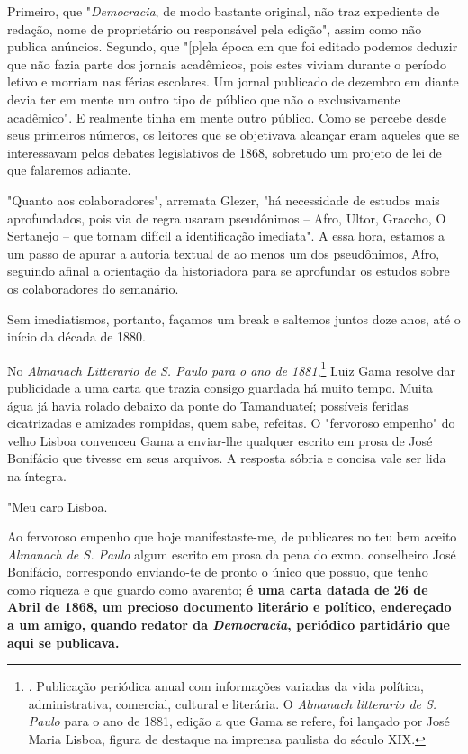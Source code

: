 Primeiro, que "\emph{Democracia}, de modo bastante original, não traz
expediente de redação, nome de proprietário ou responsável pela edição",
assim como não publica anúncios. Segundo, que "{[}p{]}ela época em que
foi editado podemos deduzir que não fazia parte dos jornais acadêmicos,
pois estes viviam durante o período letivo e morriam nas férias
escolares. Um jornal publicado de dezembro em diante devia ter em mente
um outro tipo de público que não o exclusivamente acadêmico". E
realmente tinha em mente outro público. Como se percebe desde seus
primeiros números, os leitores que se objetivava alcançar eram aqueles
que se interessavam pelos debates legislativos de 1868, sobretudo um
projeto de lei de que falaremos adiante.

"Quanto aos colaboradores", arremata Glezer, "há necessidade de estudos
mais aprofundados, pois via de regra usaram pseudônimos -- Afro, Ultor,
Graccho, O Sertanejo -- que tornam difícil a identificação imediata". A
essa hora, estamos a um passo de apurar a autoria textual de ao menos um
dos pseudônimos, Afro, seguindo afinal a orientação da historiadora para
se aprofundar os estudos sobre os colaboradores do semanário.

Sem imediatismos, portanto, façamos um break e saltemos juntos doze
anos, até o início da década de 1880.

No \emph{Almanach Litterario de S. Paulo para o ano de 1881},\footnote{.
  Publicação periódica anual com informações variadas da vida política,
  administrativa, comercial, cultural e literária. O \emph{Almanach
  litterario de S. Paulo} para o ano de 1881, edição a que Gama se
  refere, foi lançado por José Maria Lisboa, figura de destaque na
  imprensa paulista do século XIX.} Luiz Gama resolve dar publicidade a
uma carta que trazia consigo guardada há muito tempo. Muita água já
havia rolado debaixo da ponte do Tamanduateí; possíveis feridas
cicatrizadas e amizades rompidas, quem sabe, refeitas. O "fervoroso
empenho" do velho Lisboa convenceu Gama a enviar-lhe qualquer escrito em
prosa de José Bonifácio que tivesse em seus arquivos. A resposta sóbria
e concisa vale ser lida na íntegra.

"Meu caro Lisboa.

Ao fervoroso empenho que hoje manifestaste-me, de publicares no teu bem
aceito \emph{Almanach de S. Paulo} algum escrito em prosa da pena do
exmo. conselheiro José Bonifácio, correspondo enviando-te de pronto o
único que possuo, que tenho como riqueza e que guardo como avarento;
\textbf{é uma carta datada de 26 de Abril de 1868, um precioso documento
literário e político, endereçado a um amigo, quando redator da
\emph{Democracia}, periódico partidário que aqui se publicava.}

